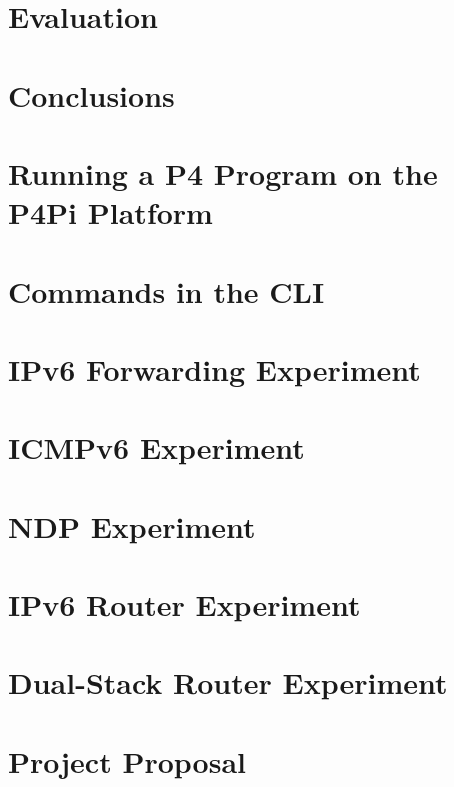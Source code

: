 \documentclass[12pt,a4paper,twoside,openright]{report}
\begin{document}
\chapter{Evaluation}



\chapter{Conclusions}



\newpage

\printbibliography


\appendix


\chapter{Running a P4 Program on the P4Pi Platform}


\chapter{Commands in the CLI}


\chapter{IPv6 Forwarding Experiment}


\chapter{ICMPv6 Experiment}


\chapter{NDP Experiment}


\chapter{IPv6 Router Experiment}


\chapter{Dual-Stack Router Experiment}


\chapter{Project Proposal}



\end{document}
